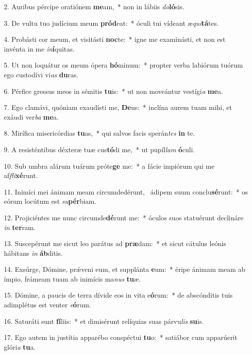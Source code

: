 2. Auribus pércipe oratiónem \textbf{me}am,~*  non in lábiis \textit{do}\textbf{ló}sis.\

3. De vultu tuo judícium meum \textbf{pród}eat:~*  óculi tui vídeant æ\textit{qui}\textbf{tá}tes.\

4. Probásti cor meum, et visitásti \textbf{noc}te:~*  igne me examinásti, et non est invénta in me \textit{in}\textbf{í}quitas.\

5. Ut non loquátur os meum ópera \textbf{hó}minum:~*  propter verba labiórum tuórum ego custodívi vi\textit{as} \textbf{du}ras.\

6. Pérfice gressus meos in sémitis \textbf{tu}is:~*  ut non moveántur vestígi\textit{a} \textbf{me}a.\

7. Ego clamávi, quóniam exaudísti me, \textbf{De}us:~*  inclína aurem tuam mihi, et exáudi ver\textit{ba} \textbf{me}a.\

8. Mirífica misericórdias \textbf{tu}as,~*  qui salvos facis sperán\textit{tes} \textbf{in} te.\

9. A resisténtibus déxteræ tuæ cus\textbf{tó}di me,~*  ut pupíl\textit{lam} \textbf{ó}culi.\

10. Sub umbra alárum tuárum próte\textbf{ge} me:~*  a fácie impiórum qui me af\textit{fli}\textbf{xé}runt.\

11. Inimíci mei ánimam meam circumdedérunt, \dag\  ádipem suum conclu\textbf{sé}runt:~*  os eórum locútum est \textit{su}\textbf{pér}biam.\

12. Projiciéntes me nunc circumde\textbf{dé}runt me:~*  óculos suos statuérunt declináre \textit{in} \textbf{ter}ram.\

13. Suscepérunt me sicut leo parátus ad \textbf{præ}dam:~*  et sicut cátulus leónis hábitans \textit{in} \textbf{áb}ditis.\

14. Exsúrge, Dómine, prǽveni eum, et supplánta \textbf{e}um:~*  éripe ánimam meam ab ímpio, frámeam tuam ab inimícis ma\textit{nus} \textbf{tu}æ.\

15. Dómine, a paucis de terra dívide eos in vita e\textbf{ó}rum:~*  de abscónditis tuis adimplétus est venter \textit{e}\textbf{ó}rum.\

16. Saturáti sunt \textbf{fí}liis:~*  et dimisérunt relíquias suas párvu\textit{lis} \textbf{su}is.\

17. Ego autem in justítia apparébo conspéctui \textbf{tu}o:~*  satiábor cum apparúerit glóri\textit{a} \textbf{tu}a.\

